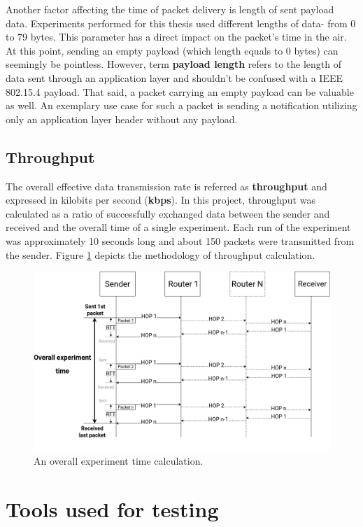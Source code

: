 Another factor affecting the time of packet delivery is length of sent payload data. 
Experiments performed for this thesis used different lengths of data- from 0 to 79 bytes. This parameter has a direct impact on the packet's 
time in the air. At this point, sending an empty payload (which length equals to 0 
bytes) can seemingly be pointless. However, term \textbf{payload length} refers to the
length of data sent through an application layer and shouldn't be confused with a IEEE 802.15.4 
payload. That said, a packet carrying an empty payload can be valuable as well. An 
exemplary use case for such a packet is sending a notification utilizing only an 
application layer header without any payload.


\subsection*{Throughput}

The overall effective data transmission rate is referred as \textbf{throughput} and expressed in kilobits per second (\textbf{kbps}). In this project, throughput was calculated as a ratio of successfully exchanged data between the sender and received and the overall time of a single experiment. Each run of the experiment
was approximately 10 seconds long and about 150 packets were transmitted from the sender. Figure \ref{fig:throughput} depicts the methodology of throughput calculation.

\begin{figure}[H]
    \centering
    \includegraphics[scale=0.35]{images/throughput-diagram.drawio.png}
    \caption{An overall experiment time calculation.}
    \label{fig:throughput}
\end{figure}

\section{Tools used for testing}

